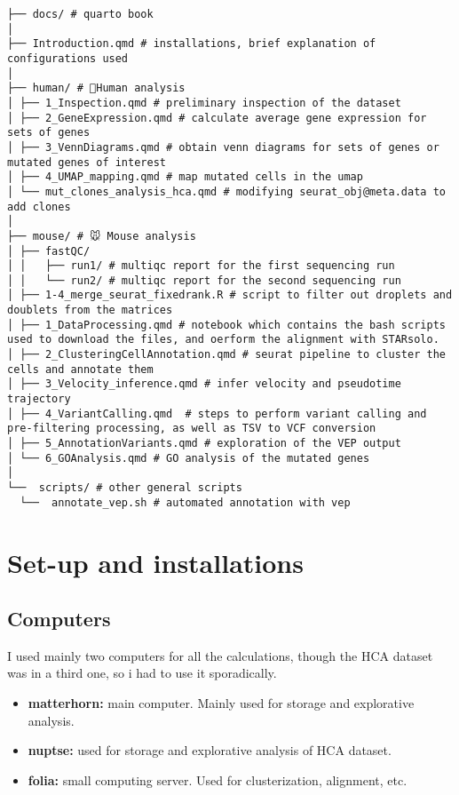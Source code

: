 \documentclass[
  letterpaper,
  DIV=11,
  numbers=noendperiod]{scrreprt}
\providecommand{\tightlist}{%
  \setlength{\itemsep}{0pt}\setlength{\parskip}{0pt}}\usepackage{longtable,booktabs,array}
\begin{document}
\begin{verbatim}
├── docs/ # quarto book
│
├── Introduction.qmd # installations, brief explanation of configurations used
│
├── human/ # 🧍Human analysis
│ ├── 1_Inspection.qmd # preliminary inspection of the dataset
│ ├── 2_GeneExpression.qmd # calculate average gene expression for sets of genes
│ ├── 3_VennDiagrams.qmd # obtain venn diagrams for sets of genes or mutated genes of interest
│ ├── 4_UMAP_mapping.qmd # map mutated cells in the umap
│ └── mut_clones_analysis_hca.qmd # modifying seurat_obj@meta.data to add clones
│
├── mouse/ # 🐭 Mouse analysis
│ ├── fastQC/
│ │   ├── run1/ # multiqc report for the first sequencing run
│ │   └── run2/ # multiqc report for the second sequencing run
│ ├── 1-4_merge_seurat_fixedrank.R # script to filter out droplets and doublets from the matrices
│ ├── 1_DataProcessing.qmd # notebook which contains the bash scripts used to download the files, and oerform the alignment with STARsolo.
│ ├── 2_ClusteringCellAnnotation.qmd # seurat pipeline to cluster the cells and annotate them
│ ├── 3_Velocity_inference.qmd # infer velocity and pseudotime trajectory
│ ├── 4_VariantCalling.qmd  # steps to perform variant calling and pre-filtering processing, as well as TSV to VCF conversion
│ ├── 5_AnnotationVariants.qmd # exploration of the VEP output
│ └── 6_GOAnalysis.qmd # GO analysis of the mutated genes
│
└──  scripts/ # other general scripts
  └──  annotate_vep.sh # automated annotation with vep
\end{verbatim}


\chapter{Set-up and installations}\label{set-up-and-installations}

\section{Computers}\label{computers}

I used mainly two computers for all the calculations, though the HCA
dataset was in a third one, so i had to use it sporadically.

\begin{itemize}
\tightlist
\item
  \textbf{matterhorn:} main computer. Mainly used for storage and
  explorative analysis.
\item
  \textbf{nuptse:} used for storage and explorative analysis of HCA
  dataset.
\item
  \textbf{folia:} small computing server. Used for clusterization,
  alignment, etc.
\end{itemize}
\end{document}

